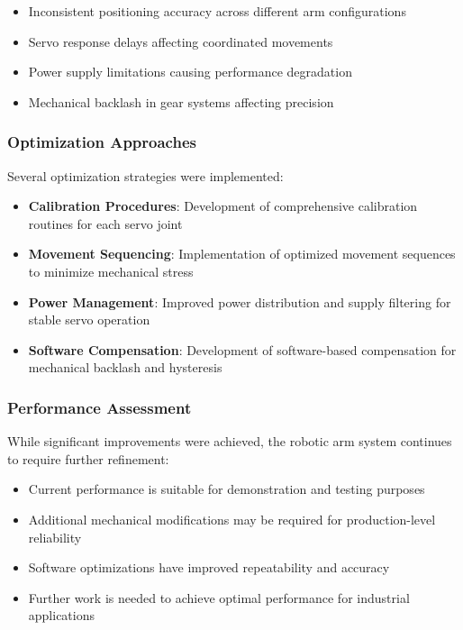 \documentclass{book}
\begin{document}
\begin{itemize}
\item Inconsistent positioning accuracy across different arm configurations
\item Servo response delays affecting coordinated movements
\item Power supply limitations causing performance degradation
\item Mechanical backlash in gear systems affecting precision
\end{itemize}

\subsubsection{Optimization Approaches}
\par\noindent Several optimization strategies were implemented:

\begin{itemize}
\item \textbf{Calibration Procedures}: Development of comprehensive calibration routines for each servo joint
\item \textbf{Movement Sequencing}: Implementation of optimized movement sequences to minimize mechanical stress
\item \textbf{Power Management}: Improved power distribution and supply filtering for stable servo operation
\item \textbf{Software Compensation}: Development of software-based compensation for mechanical backlash and hysteresis
\end{itemize}

\subsubsection{Performance Assessment}
\par\noindent While significant improvements were achieved, the robotic arm system continues to require further refinement:

\begin{itemize}
\item Current performance is suitable for demonstration and testing purposes
\item Additional mechanical modifications may be required for production-level reliability
\item Software optimizations have improved repeatability and accuracy
\item Further work is needed to achieve optimal performance for industrial applications
\end{itemize}
\end{document}
